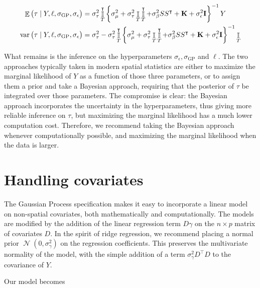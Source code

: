 \documentclass[letter]{article}
\DeclareMathOperator{\E}{\mathbb{E}}
\DeclareMathOperator{\var}{{var}}
\DeclareMathOperator{\Ind}{\mathbb{I}}
\DeclareMathOperator{\normal}{\mathcal{N}}
\newcommand{\trans}{^{\intercal}}
\newcommand{\sigmaf}{\sigma_{\mathrm{GP}}}
\newcommand{\sigman}{\sigma_{\epsilon}}
\newcommand{\sigmatau}{\sigma_{\tau}}
\newcommand{\sigmabeta}{\sigma_{\beta}}
\newcommand{\sigmamu}{\sigma_{\mu}}
\newcommand{\sigmagamma}{\sigma_{\gamma}}
\newcommand{\vectreat}{\Ind_{T}}
\newcommand{\eye}{\mathbf{I}}
\newcommand{\K}{\mathbf{K}}
\begin{document}
\begin{equation}\begin{split}
    \E \del{\tau \mid Y, \ell, \sigmaf, \sigman} &= \sigmatau^2 \vectreat\trans \cbr{\sigmamu^2 + \sigmatau^2 \vectreat \vectreat\trans + \sigmabeta^2 S S\trans + \K + \sigman^2 \eye }^{-1} Y \\
    \var \del{\tau \mid Y, \ell, \sigmaf, \sigman} &= \sigma_\tau^2 - \sigma_\tau^2 \vectreat\trans \cbr{\sigmamu^2 + \sigmatau^2 \vectreat \vectreat\trans + \sigmabeta^2 S S\trans + \K + \sigman^2 \eye }^{-1} \vectreat
\end{split}\end{equation}

What remains is the inference on the hyperparameters \(\sigman, \sigmaf\) and \(\ell\). The two approaches typically taken in modern spatial statistics are either to maximize the marginal likelihood of \(Y\) as a function of those three parameters, or to assign them a prior and take a Bayesian approach, requiring that the posterior of \(\tau\) be integrated over those parameters. The compromise is clear: the Bayesian approach incorporates the uncertainty in the hyperparameters, thus giving more reliable inference on \(\tau\), but maximizing the marginal likelihood has a much lower computation cost. Therefore, we recommend taking the Bayesian approach whenever computationally possible, and maximizing the marginal likelihood when the data is larger.
    


    	\section{Handling covariates}\label{handling-covariates}

The Gaussian Process specification makes it easy to incorporate a linear model on non-spatial covariates, both mathematically and computationally.
The models are modified by the addition of the linear regression term \(D \gamma\) on the \(n \times p\) matrix of covariates \(D\). In the spirit of ridge regression, we recommend placing a normal prior \(\normal(0,\sigmagamma^2)\) on the regression coefficients. This preserves the multivariate normality of the model, with the simple addition of a term \(\sigmagamma^2 D\trans D\) to the covariance of \(Y\).

Our model becomes
\end{document}
